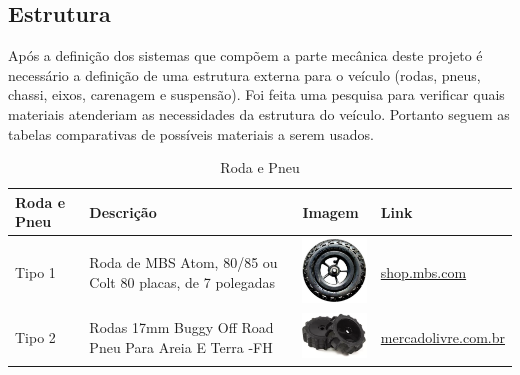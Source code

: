   \newpage

  \subsection{Estrutura}
  Após a definição dos sistemas que compõem a parte mecânica deste projeto é necessário a definição de uma estrutura externa para o veículo (rodas, pneus, chassi, eixos, carenagem e suspensão). Foi feita uma pesquisa para verificar quais materiais atenderiam as necessidades da estrutura do veículo. Portanto seguem as tabelas comparativas de possíveis materiais a serem usados.

  \begin{table}[!htbp]
  \begin{center}
  \caption{Roda e Pneu}
  \begin{tabular}{|p{2cm}|p{3cm}|p{2cm}|p{4cm}|}
  \hline
  \textbf{Roda e Pneu} & \textbf{Descrição} & \textbf{Imagem} & \textbf{Link}\\\hline\hline
  Tipo 1 & Roda de MBS Atom, 80/85 ou Colt 80 placas, de 7 polegadas & \includegraphics[width=2cm]{figuras/roda_mbs.eps} & \href{http://shop.mbs.com/accessories-488/mountainboard-wheels/complete-wheels/complete-7-wheel.html}{shop.mbs.com}\\\hline
  Tipo 2 & Rodas 17mm Buggy Off Road Pneu Para Areia E Terra -FH & \includegraphics[width=2cm]{figuras/roda_buggy.eps} & \href{http://produto.mercadolivre.com.br/MLB-788601174-par-de-rodas-17mm-buggy-off-road-pneu-para-areia-e-terra-fh-_JM}{mercadolivre.com.br}\\\hline
  \end{tabular}
  \end{center}
  \end{table}

